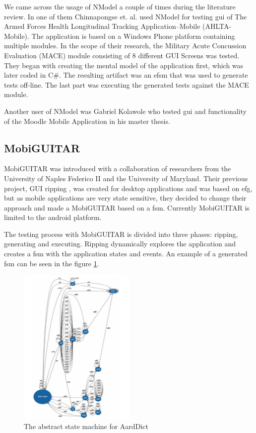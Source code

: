 \par
We came across the usage of NModel a couple of times during the literature review. In one of them Chinnapongse et. al. \cite{Chinnapongse_NModel} used NModel for testing \acrshort{gui} of The Armed Forces Health Longitudinal Tracking Application–Mobile (AHLTA-Mobile). The application is based on a Windows Phone platform containing multiple modules. In the scope of their research, the Military Acute Concussion Evaluation (MACE) module consisting of 8 different GUI Screens was tested. They began with creating the mental model of the application first, which was later coded in C\#. The resulting artifact was an \acrshort{efsm} that was used to generate tests off-line. The last part was executing the generated tests against the MACE module.
\par
Another user of NModel was Gabriel Kolawole \cite{Kolawole_NModel} who tested \acrshort{gui} and functionality of the Moodle Mobile Application in his master thesis.

\subsection{MobiGUITAR}
\par
MobiGUITAR \cite{MobiGUITAR} was introduced with a collaboration of researchers from the University of Naples Federico II and the University of Maryland. Their previous project, GUI ripping \cite{GUIripping}, was created for desktop applications and was based on \acrshort{efg}, but as mobile applications are very state sensitive, they decided to change their approach and made a MobiGUITAR based on a \acrshort{fsm}. Currently MobiGUITAR is limited to the android platform.

\par
The testing process with MobiGUITAR is divided into three phases: ripping, generating and executing. Ripping dynamically explores the application and creates a \acrshort{fsm} with the application states and events. An example of a generated \acrshort{fsm} can be seen in the figure \ref{Fig:MobiGuitar}.

\begin{figure} [htbp!]
	\centering
					\includegraphics[width=0.5\textwidth]{figures/mobiguitar.JPG}
					\caption{\label{Fig:MobiGuitar} The abstract state machine for AardDict\cite{MobiGUITAR}}
\end{figure}

